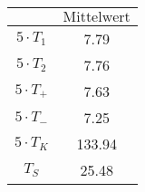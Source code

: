 \begin{minipage}{0.49\textwidth}
 \centering
 \begin{tabular}{S S}
 \toprule
$\text{}$ & $\text{Mittelwert}$ \\
 \midrule
 ${5} \cdot T_{1}$ &  7.79  \\
  ${5} \cdot T_{2}$ & 7.76  \\
${5} \cdot T_{+}$  &  7.63  \\
${5} \cdot T_{-}$  & 7.25  \\
${5} \cdot T_{K}$  & 133.94  \\
$T_{S}$ & 25.48 \\
 \bottomrule
 \end{tabular}
 \label{tab:mids_T_60}
  \end{minipage}
